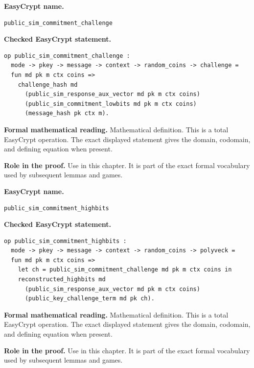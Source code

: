 \begin{formaldefinition}
\noindent\textbf{EasyCrypt name.}
\begin{lstlisting}[language=EasyCrypt,basicstyle=\ttfamily\scriptsize]
public_sim_commitment_challenge
\end{lstlisting}
\noindent\textbf{Checked EasyCrypt statement.}
\begin{lstlisting}[language=EasyCrypt,basicstyle=\ttfamily\scriptsize]
op public_sim_commitment_challenge :
  mode -> pkey -> message -> context -> random_coins -> challenge =
  fun md pk m ctx coins =>
    challenge_hash md
      (public_sim_response_aux_vector md pk m ctx coins)
      (public_sim_commitment_lowbits md pk m ctx coins)
      (message_hash pk ctx m).
\end{lstlisting}
\noindent\textbf{Formal mathematical reading.}
Mathematical definition. This is a total EasyCrypt operation.  The exact displayed statement gives the domain, codomain, and defining equation when present.

\noindent\textbf{Role in the proof.}
Use in this chapter. It is part of the exact formal vocabulary used by subsequent lemmas and games.

\end{formaldefinition}

\begin{formaldefinition}
\noindent\textbf{EasyCrypt name.}
\begin{lstlisting}[language=EasyCrypt,basicstyle=\ttfamily\scriptsize]
public_sim_commitment_highbits
\end{lstlisting}
\noindent\textbf{Checked EasyCrypt statement.}
\begin{lstlisting}[language=EasyCrypt,basicstyle=\ttfamily\scriptsize]
op public_sim_commitment_highbits :
  mode -> pkey -> message -> context -> random_coins -> polyveck =
  fun md pk m ctx coins =>
    let ch = public_sim_commitment_challenge md pk m ctx coins in
    reconstructed_highbits md
      (public_sim_response_aux_vector md pk m ctx coins)
      (public_key_challenge_term md pk ch).
\end{lstlisting}
\noindent\textbf{Formal mathematical reading.}
Mathematical definition. This is a total EasyCrypt operation.  The exact displayed statement gives the domain, codomain, and defining equation when present.

\noindent\textbf{Role in the proof.}
Use in this chapter. It is part of the exact formal vocabulary used by subsequent lemmas and games.

\end{formaldefinition}

